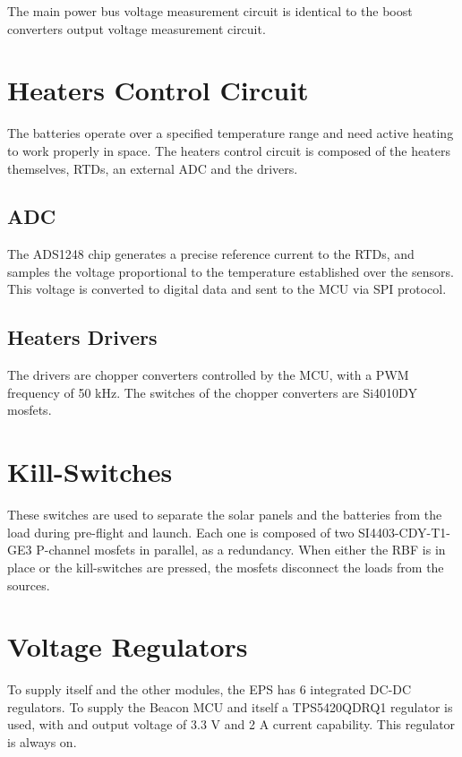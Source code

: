 The main power bus voltage measurement circuit is identical to the boost converters output voltage measurement circuit.

\section{Heaters Control Circuit}

The batteries operate over a specified temperature range and need active heating to work properly in space. The heaters control circuit is composed of the heaters themselves, RTDs, an external ADC and the drivers.

\subsection{ADC}

The ADS1248 chip generates a precise reference current to the RTDs, and samples the voltage proportional to the temperature established over the sensors. This voltage is converted to digital data and sent to the MCU via SPI protocol.

\subsection{Heaters Drivers}

The drivers are chopper converters controlled by the MCU, with a PWM frequency of 50 kHz. The switches of the chopper converters are Si4010DY mosfets.

\section{Kill-Switches}

These switches are used to separate the solar panels and the batteries from the load during pre-flight and launch. Each one is composed of two SI4403-CDY-T1-GE3 P-channel mosfets in parallel, as a redundancy. When either the RBF is in place or the kill-switches are pressed, the mosfets disconnect the loads from the sources.

\section{Voltage Regulators}

To supply itself and the other modules, the EPS has 6 integrated DC-DC regulators. To supply the Beacon MCU and itself a TPS5420QDRQ1 regulator is used, with and output voltage of 3.3 V and 2 A current capability. This regulator is always on.

